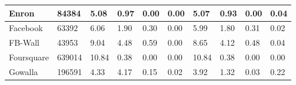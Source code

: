 \documentclass[12pt,3p]{article}
\begin{document}
\begin{table}[htp]
{\begin{tabular}{|l|l|l|l|l|l|l|l|l|l|}
Enron	&	84384	&	5.08	&	0.97	&	0.00	&	0.00	&	5.07	&	0.93	&	0.00	&	0.04	\\ \hline																							
Facebook	&	63392	&	6.06	&	1.90	&	0.30	&	0.00	&	5.99	&	1.80	&	0.31	&	0.02	\\ \hline																					
FB-Wall	&	43953	&	9.04	&	4.48	&	0.59	&	0.00	&	8.65	&	4.12	&	0.48	&	0.04	\\ \hline
																	
Foursquare	&	639014	&	10.84	&	0.38	&	0.00	&	0.00	&	10.84	&	0.38&	0.00	&	0.00	\\ \hline
																			
Gowalla	&	196591	&	4.33	&	4.17	&	0.15	&	0.02	&	3.92	&	1.32	&	0.03	&	0.22	\\ \hline
																	
\end{tabular}	
}																	
\end{table}
\end{document}
